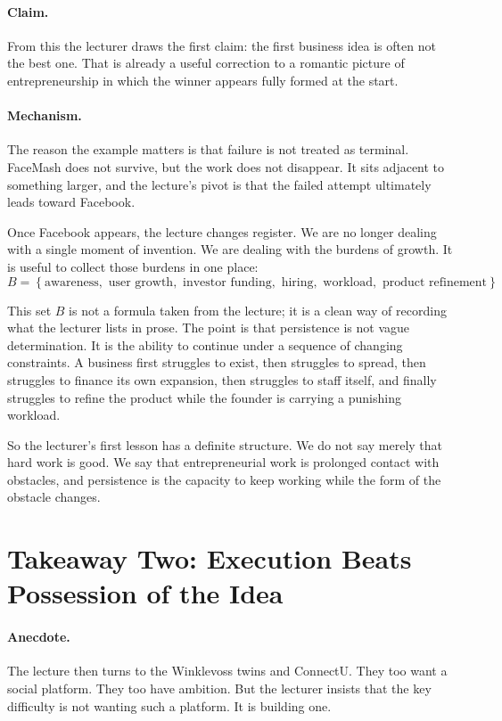 \paragraph{Claim.}
From this the lecturer draws the first claim: the first business idea is often not the best one. That is already a useful correction to a romantic picture of entrepreneurship in which the winner appears fully formed at the start.

\paragraph{Mechanism.}
The reason the example matters is that failure is not treated as terminal. FaceMash does not survive, but the work does not disappear. It sits adjacent to something larger, and the lecture's pivot is that the failed attempt ultimately leads toward Facebook.

Once Facebook appears, the lecture changes register. We are no longer dealing with a single moment of invention. We are dealing with the burdens of growth. It is useful to collect those burdens in one place:
\begin{equation}
B
=
\left\{
\text{awareness},
\text{ user growth},
\text{ investor funding},
\text{ hiring},
\text{ workload},
\text{ product refinement}
\right\}
\end{equation}

This set \(B\) is not a formula taken from the lecture; it is a clean way of recording what the lecturer lists in prose. The point is that persistence is not vague determination. It is the ability to continue under a sequence of changing constraints. A business first struggles to exist, then struggles to spread, then struggles to finance its own expansion, then struggles to staff itself, and finally struggles to refine the product while the founder is carrying a punishing workload.

So the lecturer's first lesson has a definite structure. We do not say merely that hard work is good. We say that entrepreneurial work is prolonged contact with obstacles, and persistence is the capacity to keep working while the form of the obstacle changes.

\section{Takeaway Two: Execution Beats Possession of the Idea}

\paragraph{Anecdote.}
The lecture then turns to the Winklevoss twins and ConnectU. They too want a social platform. They too have ambition. But the lecturer insists that the key difficulty is not wanting such a platform. It is building one.

